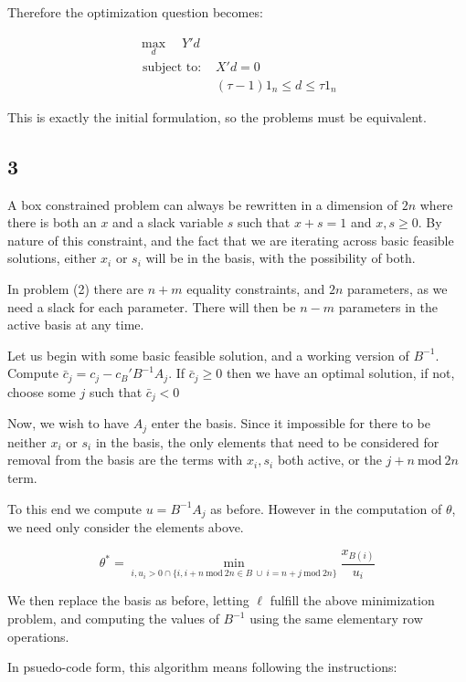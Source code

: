 \documentclass[12pt]{paper}
\newcommand{\Mod}[1]{\ \mathrm{mod}\ #1}
\newcommand{\inv}[1]{{#1}^{-1}}
\begin{document}
Therefore the optimization question becomes:

\begin{align*}
  \max_d \quad Y'd\\
  \text{ subject to: } & X'd = 0\\
  & (\tau-1)1_n \leq d \leq \tau 1_n
\end{align*}

This is exactly the initial formulation, so the problems must be
equivalent.

\subsection{3}

A box constrained problem can always be rewritten in a dimension of
$2n$ where there is both an $x$ and a slack variable $s$ such that
$x+s =1$ and $x,s \geq 0$. By nature of this constraint, and the fact
that we are iterating across basic feasible solutions, either $x_i$ or
$s_i$ will be in the basis, with the possibility of both.

In problem (2) there are $n+m$ equality constraints, and $2n$
parameters, as we need a slack for each parameter. There will then be
$n-m$ parameters in the active basis at any time.

Let us begin with some basic feasible solution, and a working version
of $\inv{B}$. Compute $\bar{c}_j = c_j - c_B' \inv{B} A_j$. If
$\bar{c}_j \geq 0$ then we have an optimal solution, if not, choose some
$j$ such that $\bar{c}_j < 0$

Now, we wish to have $A_j$ enter the basis. Since it impossible for
there to be neither $x_i$ or $s_i$ in the basis, the only elements
that need to be considered for removal from the basis are the terms
with $x_i,s_i$ both active, or the $j + n \Mod 2n$ term.

To this end we compute $u = \inv{B}A_j$ as before. However in the
computation of $\theta$, we need only consider the elements above.

\begin{equation*}
  \theta^{*} = \min_{i, u_i > 0 \cap \{ i, i+n \Mod 2n \in B\: \cup\: i = n+j \Mod 2n\}} \frac{x_{B(i)}}{u_i}
\end{equation*}

We then replace the basis as before, letting $\ell$ fulfill the above
minimization problem, and computing the values of $\inv{B}$ using the
same elementary row operations.

In psuedo-code form, this algorithm means following the instructions:
\end{document}
